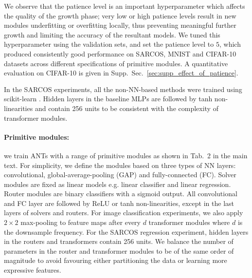 We observe that the patience level is an important hyperparameter which affects the quality of the growth phase; very low or high patience levels result in new modules underfitting or overfitting locally, thus preventing meaningful further growth and limiting the accuracy of the resultant models. We tuned this hyperparameter using the validation sets, and set the patience level to $5$, which produced consistently good performance on SARCOS, MNIST and CIFAR-10 datasets across different specifications of primitive modules. A quantitative evaluation on CIFAR-10 is given in Supp.~Sec.~\ref{sec:supp_effect_of_patience}.

In the SARCOS experiments, all the non-NN-based methods were trained using scikit-learn \citep{pedregosa2011scikit}. Hidden layers in the baseline MLPs are followed by tanh non-linearities and contain 256 units to be consistent with the complexity of transformer modules.

\vspace{-3mm}
\paragraph{Primitive modules:} we train ANTs with a range of primitive modules as shown in Tab.~2 in the main text. For simplicity, we define the modules based on three types of NN layers: convolutional, global-average-pooling (GAP) and fully-connected (FC). Solver modules are fixed as linear models e.g. linear classifier and linear regression. Router modules are binary classifiers with a sigmoid output. All convolutional and FC layer are followed by ReLU or tanh non-linearities, except in the last layers of solvers and routers. For image classification experiments, we also apply $2\times2$ max-pooling to feature maps after every $d$ transformer modules where $d$ is the downsample frequency. For the SARCOS regression experiment, hidden layers in the routers and transformers contain 256 units. We balance the number of parameters in the router and transformer modules to be of the same order of magnitude to avoid favouring either partitioning the data or learning more expressive features. 



